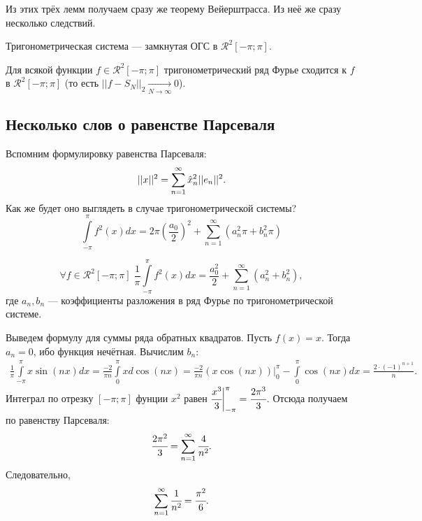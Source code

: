 Из этих трёх лемм получаем сразу же теорему Вейерштрасса. Из неё же сразу несколько следствий.
\begin{Consequence}
	Тригонометрическая система --- замкнутая ОГС в $\mathcal{R}^2[-\pi;\pi].$
\end{Consequence}
\begin{Consequence}
	Для всякой функции $f \in \mathcal{R}^2[-\pi;\pi]$ тригонометрический ряд Фурье сходится к $f$ в $\mathcal{R}^2[-\pi; \pi]$ (то есть $|| f - S_N||_2\underset{N \to \infty}{\longrightarrow} 0$).
\end{Consequence}
\subsection{Несколько слов о равенстве Парсеваля}
Вспомним формулировку равенства Парсеваля:
$$
	||x||^2 = \sum\limits_{n=1}^{\infty} \hat{x}_n^2 ||e_n||^2.
$$
Как же будет оно выглядеть в случае тригонометрической системы? 
$$\int\limits_{-\pi}^{\pi} f^2(x)dx =2\pi\left( \frac{a_0}{2}\right)^2 + \sum\limits_{n=1}^{\infty}(a_n^2\pi + b_n^2\pi)
$$
\begin{Consequence}
	$$
	\forall f \in \mathcal{R}^2[-\pi;\pi]\; \frac{1}{\pi} \int\limits_{-\pi}^{\pi} f^2(x)dx = \frac{a_0^2}{2} + \sum\limits_{n=1}^{\infty}(a_n^2 + b_n^2),
	$$ где $a_n, b_n$ --- коэффициенты разложения в ряд Фурье по тригонометрической системе.
\end{Consequence}
\begin{Examples}
	Выведем формулу для суммы ряда обратных квадратов. Пусть $f(x) = x$. Тогда $a_n = 0$, ибо функция нечётная. Вычислим $b_n$:
	\begin{gather*}
		\frac{1}{\pi} \int \limits_{-\pi}^{\pi} x \sin(nx)dx = \frac{-2}{\pi n} \int \limits_{0}^{\pi}x d\cos(nx) = \frac{-2}{\pi n}\left(x \cos(nx)\right)\biggr|_0^{\pi} - \int \limits_{0}^{\pi}\cos(nx) dx = \frac{2\cdot(-1)^{n+1}}{n}.
	\end{gather*}
	Интеграл по отрезку $[-\pi;\pi]$ фунции $x^2$ равен $\cfrac{x^3}{3}\biggr|_{-\pi}^{\pi} = \cfrac{2\pi^3}{3}$. Отсюда получаем по равенству Парсеваля:
    $$
		\cfrac{2\pi^2}{3} = \sum\limits_{n=1}^{\infty} \cfrac{4}{n^2}.
    $$
    Следовательно,
    $$
		\sum\limits_{n=1}^{\infty} \cfrac{1}{n^2} = \cfrac{\pi^2}{6}.
	$$
\end{Examples}
